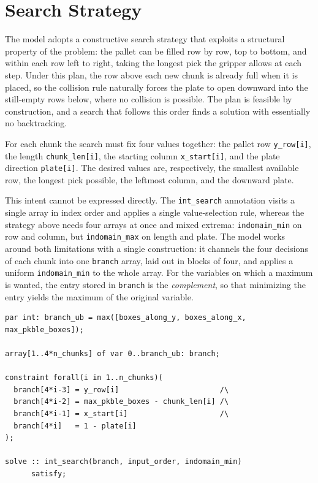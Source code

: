 \section{Search Strategy}
\label{sec:search}

The model adopts a constructive search strategy that exploits a structural
property of the problem: the pallet can be filled row by row, top to
bottom, and within each row left to right, taking the longest pick the
gripper allows at each step. Under this plan, the row above each new chunk
is already full when it is placed, so the collision rule naturally forces
the plate to open downward into the still-empty rows below, where no
collision is possible. The plan is feasible by construction, and a search
that follows this order finds a solution with essentially no backtracking.

For each chunk the search must fix four values together: the pallet row
\texttt{y\_row[i]}, the length \texttt{chunk\_len[i]}, the starting column
\texttt{x\_start[i]}, and the plate direction \texttt{plate[i]}. The
desired values are, respectively, the smallest available row, the longest
pick possible, the leftmost column, and the downward plate.

This intent cannot be expressed directly. The \texttt{int\_search}
annotation visits a single array in index order and applies a single
value-selection rule, whereas the strategy above needs four arrays at once
and mixed extrema: \texttt{indomain\_min} on row and column, but
\texttt{indomain\_max} on length and plate. The model works around both
limitations with a single construction: it channels the four decisions of
each chunk into one \texttt{branch} array, laid out in blocks of four, and
applies a uniform \texttt{indomain\_min} to the whole array. For the
variables on which a maximum is wanted, the entry stored in
\texttt{branch} is the \emph{complement}, so that minimizing the entry
yields the maximum of the original variable.

\vspace{0.5cm}
\begin{lstlisting}
par int: branch_ub = max([boxes_along_y, boxes_along_x, max_pkble_boxes]);

array[1..4*n_chunks] of var 0..branch_ub: branch;

constraint forall(i in 1..n_chunks)(
  branch[4*i-3] = y_row[i]                       /\
  branch[4*i-2] = max_pkble_boxes - chunk_len[i] /\
  branch[4*i-1] = x_start[i]                     /\
  branch[4*i]   = 1 - plate[i]
);

solve :: int_search(branch, input_order, indomain_min)
      satisfy;
\end{lstlisting}
\vspace{0.5cm}

